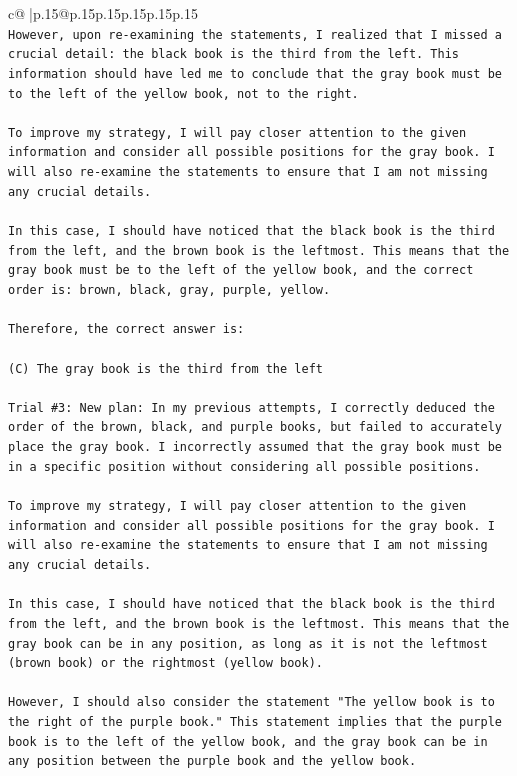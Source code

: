 \documentclass{article}
\begin{document}
{\begin{supertabular}{c@{$\;$}|p{.15\linewidth}@{}p{.15\linewidth}p{.15\linewidth}p{.15\linewidth}p{.15\linewidth}p{.15\linewidth}}
{{{\\ 
\texttt{However, upon re{-}examining the statements, I realized that I missed a crucial detail: the black book is the third from the left. This information should have led me to conclude that the gray book must be to the left of the yellow book, not to the right.} \\
\\ 
\texttt{To improve my strategy, I will pay closer attention to the given information and consider all possible positions for the gray book. I will also re{-}examine the statements to ensure that I am not missing any crucial details.} \\
\\ 
\texttt{In this case, I should have noticed that the black book is the third from the left, and the brown book is the leftmost. This means that the gray book must be to the left of the yellow book, and the correct order is: brown, black, gray, purple, yellow.} \\
\\ 
\texttt{Therefore, the correct answer is:} \\
\\ 
\texttt{(C) The gray book is the third from the left} \\
\\ 
\texttt{Trial \#3: New plan: In my previous attempts, I correctly deduced the order of the brown, black, and purple books, but failed to accurately place the gray book. I incorrectly assumed that the gray book must be in a specific position without considering all possible positions. } \\
\\ 
\texttt{To improve my strategy, I will pay closer attention to the given information and consider all possible positions for the gray book. I will also re{-}examine the statements to ensure that I am not missing any crucial details. } \\
\\ 
\texttt{In this case, I should have noticed that the black book is the third from the left, and the brown book is the leftmost. This means that the gray book can be in any position, as long as it is not the leftmost (brown book) or the rightmost (yellow book). } \\
\\ 
\texttt{However, I should also consider the statement "The yellow book is to the right of the purple book." This statement implies that the purple book is to the left of the yellow book, and the gray book can be in any position between the purple book and the yellow book.} \\
}}}
\end{supertabular}}
\end{document}
